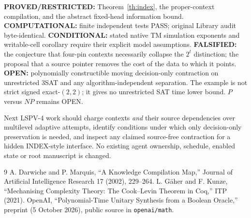 \documentclass[11pt]{article}
\begin{document}
\noindent\textbf{PROVED/RESTRICTED:} Theorem~\ref{th:index}, the proper-context compilation, and the abstract fixed-head information bound. \textbf{COMPUTATIONAL:} finite independent tests PASS; original Library audit byte-identical. \textbf{CONDITIONAL:} stated native TM simulation exponents and writable-cell corollary require their explicit model assumptions. \textbf{FALSIFIED:} the conjecture that four-pin contexts necessarily collapse the $2^t$ distinction; the proposal that a source pointer removes the cost of the data to which it points. \textbf{OPEN:} polynomially constructible moving decision-only contraction on unrestricted 3SAT and any algorithm-independent separation. The example is not strict signed exact-$(2,2)$; it gives no unrestricted SAT time lower bound. $P$ versus $NP$ remains OPEN.

Next LSPV-4 work should charge contexts \emph{and} their source dependencies over multilevel adaptive attempts, identify conditions under which only decision-only preservation is needed, and inspect any claimed source-free contraction for a hidden INDEX-style interface. No existing agent ownership, schedule, enabled state or root manuscript is changed.
\begin{thebibliography}{9}
 A. Darwiche and P. Marquis, ``A Knowledge Compilation Map,''
Journal of Artificial Intelligence Research 17 (2002), 229--264.
 L. G\"aher and F. Kunze, ``Mechanising Complexity Theory: The Cook--Levin Theorem in Coq,'' ITP (2021).
 OpenAI, ``Polynomial-Time Unitary Synthesis from a Boolean Oracle,'' preprint (5 October 2026), public source in \texttt{openai/math}.
\end{thebibliography}
\end{document}
